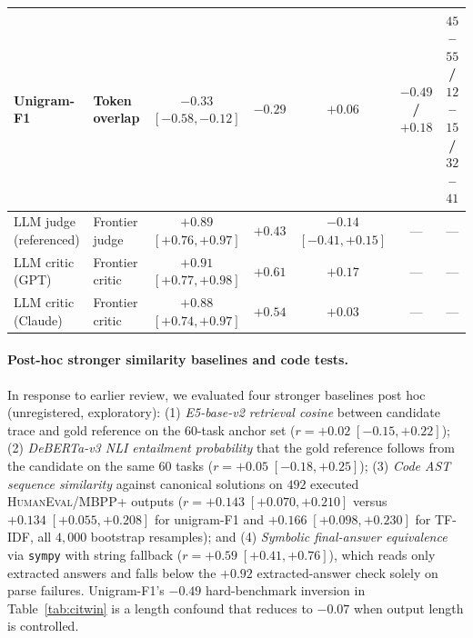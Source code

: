 \begin{table}[t]
\begin{tabular}{@{}llccccc@{}}
Unigram-F1 & Token overlap & $-0.33$ $[-0.58, -0.12]$ & $-0.29$ & $+0.06$ & $-0.49$ / $+0.18$ & $45$--$55$ / $12$--$15$ / $32$--$41$ \\
\midrule
LLM judge (referenced) & Frontier judge & $+0.89$ $[+0.76, +0.97]$ & $+0.43$ & $-0.14$ $[-0.41, +0.15]$ & --- & --- \\
LLM critic (GPT) & Frontier critic & $+0.91$ $[+0.77, +0.98]$ & $+0.61$ & $+0.17$ & --- & --- \\
LLM critic (Claude) & Frontier critic & $+0.88$ $[+0.74, +0.97]$ & $+0.54$ & $+0.03$ & --- & --- \\
\bottomrule
\end{tabular}
\end{table}

\paragraph{Post-hoc stronger similarity baselines and code tests.}
In response to earlier review, we evaluated four stronger baselines post hoc (unregistered, exploratory): (1) \emph{E5-base-v2 retrieval cosine} between candidate trace and gold reference on the $60$-task anchor set ($r = +0.02 \; [-0.15, +0.22]$); (2) \emph{DeBERTa-v3 NLI entailment probability} that the gold reference follows from the candidate on the same $60$ tasks ($r = +0.05 \; [-0.18, +0.25]$); (3) \emph{Code AST sequence similarity} against canonical solutions on $492$ executed \textsc{HumanEval}/\textsc{MBPP+} outputs ($r = +0.143 \; [+0.070, +0.210]$ versus $+0.134 \; [+0.055, +0.208]$ for unigram-F1 and $+0.166 \; [+0.098, +0.230]$ for TF-IDF, all $4{,}000$ bootstrap resamples); and (4) \emph{Symbolic final-answer equivalence} via \texttt{sympy} with string fallback ($r = +0.59 \; [+0.41, +0.76]$), which reads only extracted answers and falls below the $+0.92$ extracted-answer check solely on parse failures.
Unigram-F1's $-0.49$ hard-benchmark inversion in Table~\ref{tab:citwin} is a length confound that reduces to $-0.07$ when output length is controlled.

